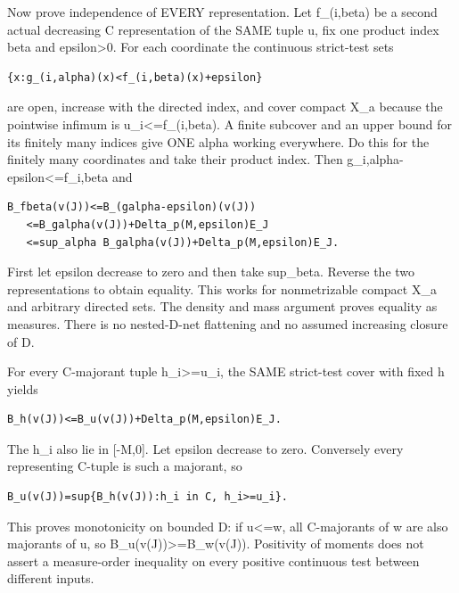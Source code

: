 \documentclass[11pt]{article}
\begin{document}
Now prove independence of EVERY representation. Let f\_(i,beta) be a second actual decreasing C representation of the SAME tuple u, fix one product index beta and epsilon>0. For each coordinate the continuous strict-test sets

\begin{Verbatim}[fontsize=\small,breaklines=true,breakanywhere=true]
{x:g_(i,alpha)(x)<f_(i,beta)(x)+epsilon}
\end{Verbatim}

are open, increase with the directed index, and cover compact X\_a because the pointwise infimum is u\_i<=f\_(i,beta). A finite subcover and an upper bound for its finitely many indices give ONE alpha working everywhere. Do this for the finitely many coordinates and take their product index. Then g\_i,alpha-epsilon<=f\_i,beta and

\begin{Verbatim}[fontsize=\small,breaklines=true,breakanywhere=true]
B_fbeta(v(J))<=B_(galpha-epsilon)(v(J))
   <=B_galpha(v(J))+Delta_p(M,epsilon)E_J
   <=sup_alpha B_galpha(v(J))+Delta_p(M,epsilon)E_J.
\end{Verbatim}

First let epsilon decrease to zero and then take sup\_beta. Reverse the two representations to obtain equality. This works for nonmetrizable compact X\_a and arbitrary directed sets. The density and mass argument proves equality as measures. There is no nested-D-net flattening and no assumed increasing closure of D.

For every C-majorant tuple h\_i>=u\_i, the SAME strict-test cover with fixed h yields

\begin{Verbatim}[fontsize=\small,breaklines=true,breakanywhere=true]
B_h(v(J))<=B_u(v(J))+Delta_p(M,epsilon)E_J.
\end{Verbatim}

The h\_i also lie in [-M,0]. Let epsilon decrease to zero. Conversely every representing C-tuple is such a majorant, so

\begin{Verbatim}[fontsize=\small,breaklines=true,breakanywhere=true]
B_u(v(J))=sup{B_h(v(J)):h_i in C, h_i>=u_i}.
\end{Verbatim}

This proves monotonicity on bounded D: if u<=w, all C-majorants of w are also majorants of u, so B\_u(v(J))>=B\_w(v(J)). Positivity of moments does not assert a measure-order inequality on every positive continuous test between different inputs.
\end{document}
